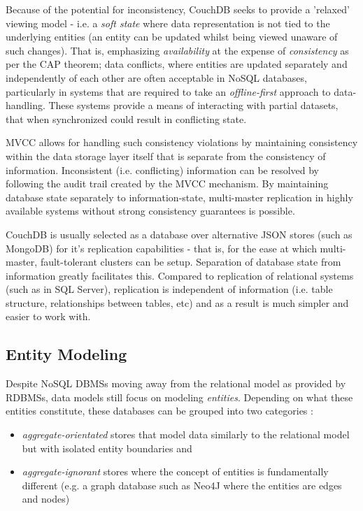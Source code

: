 Because of the potential for inconsistency, CouchDB seeks to provide a 'relaxed' viewing model - i.e. a \textit{soft state} where data representation is not tied to the underlying entities (an entity can be updated whilst being viewed unaware of such changes). That is, emphasizing \textit{availability} at the expense of \textit{consistency} as per the CAP theorem; data conflicts, where entities are updated separately and independently of each other are often acceptable in NoSQL databases, particularly in systems that are required to take an \textit{offline-first} approach to data-handling. These systems provide a means of interacting with partial datasets, that when synchronized could result in conflicting state.

MVCC allows for handling such consistency violations by maintaining consistency within the data storage layer itself that is separate from the consistency of information. Inconsistent (i.e. conflicting) information can be resolved by following the audit trail created by the MVCC mechanism. By maintaining database state separately to information-state, multi-master replication in highly available systems without strong consistency guarantees is possible.

CouchDB is usually selected as a database over alternative JSON stores (such as MongoDB) for it's replication capabilities - that is, for the ease at which multi-master, fault-tolerant clusters can be setup. Separation of database state from information greatly facilitates this. Compared to replication of relational systems (such as in SQL Server), replication is independent of information (i.e. table structure, relationships between tables, etc) and as a result is much simpler and easier to work with.

\subsection{Entity Modeling}
Despite NoSQL DBMSs moving away from the relational model as provided by RDBMSs, data models still focus on modeling \textit{entities}. Depending on what these entities constitute, these databases can be grouped into two categories \cite{fowlerAggregate}:

\begin{itemize}
    \item \textit{aggregate-orientated} stores that model data similarly to the relational model but with isolated entity boundaries and
    \item \textit{aggregate-ignorant} stores where the concept of entities is fundamentally different (e.g. a graph database such as Neo4J \cite{sadalage2012} where the entities are edges and nodes)
\end{itemize}

